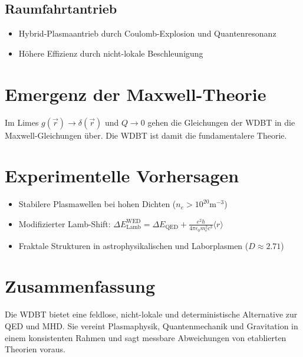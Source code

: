 \documentclass[10pt, a4paper]{article}
\begin{document}
\subsection*{Raumfahrtantrieb}
\begin{itemize}
    \item Hybrid-Plasmaantrieb durch Coulomb-Explosion und Quantenresonanz
    \item Höhere Effizienz durch nicht-lokale Beschleunigung
\end{itemize}

\section*{Emergenz der Maxwell-Theorie}
Im Limes $g(\vec{r}) \to \delta(\vec{r})$ und $Q \to 0$ gehen die Gleichungen der WDBT in die Maxwell-Gleichungen über. Die WDBT ist damit die fundamentalere Theorie.

\section*{Experimentelle Vorhersagen}
\begin{itemize}
    \item Stabilere Plasmawellen bei hohen Dichten ($n_e > 10^{20}  \text{m}^{-3}$)
    \item Modifizierter Lamb-Shift: $\Delta E_{\text{Lamb}}^{\text{WED}} = \Delta E_{\text{QED}} + \frac{e^2 h}{4\pi\epsilon_0 m_e^2 c^3} \langle r \rangle$
    \item Fraktale Strukturen in astrophysikalischen und Laborplasmen ($D \approx 2.71$)
\end{itemize}

\section*{Zusammenfassung}
Die WDBT bietet eine feldlose, nicht-lokale und deterministische Alternative zur QED und MHD. Sie vereint Plasmaphysik, Quantenmechanik und Gravitation in einem konsistenten Rahmen und sagt messbare Abweichungen von etablierten Theorien voraus.
\end{document}

